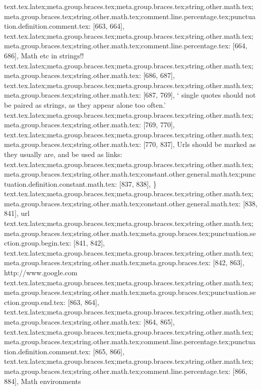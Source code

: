 {{{{{{{{{{{{{{{{{{{{{{{text.tex.latex;meta.group.braces.tex;meta.group.braces.tex;string.other.math.tex;meta.group.braces.tex;string.other.math.tex;comment.line.percentage.tex;punctuation.definition.comment.tex: [663, 664], {%
text.tex.latex;meta.group.braces.tex;meta.group.braces.tex;string.other.math.tex;meta.group.braces.tex;string.other.math.tex;comment.line.percentage.tex: [664, 686], { Math etc in strings!!}
text.tex.latex;meta.group.braces.tex;meta.group.braces.tex;string.other.math.tex;meta.group.braces.tex;string.other.math.tex: [686, 687], {
}
text.tex.latex;meta.group.braces.tex;meta.group.braces.tex;string.other.math.tex;meta.group.braces.tex;string.other.math.tex: [687, 769], {` single quotes should not be paired as strings, as they appear alone too often.'
}
text.tex.latex;meta.group.braces.tex;meta.group.braces.tex;string.other.math.tex;meta.group.braces.tex;string.other.math.tex: [769, 770], {
}
text.tex.latex;meta.group.braces.tex;meta.group.braces.tex;string.other.math.tex;meta.group.braces.tex;string.other.math.tex: [770, 837], {Urls should be marked as they usually are, and be used as links:   }
text.tex.latex;meta.group.braces.tex;meta.group.braces.tex;string.other.math.tex;meta.group.braces.tex;string.other.math.tex;constant.other.general.math.tex;punctuation.definition.constant.math.tex: [837, 838], {\}
text.tex.latex;meta.group.braces.tex;meta.group.braces.tex;string.other.math.tex;meta.group.braces.tex;string.other.math.tex;constant.other.general.math.tex: [838, 841], {url}
text.tex.latex;meta.group.braces.tex;meta.group.braces.tex;string.other.math.tex;meta.group.braces.tex;string.other.math.tex;meta.group.braces.tex;punctuation.section.group.begin.tex: [841, 842], {{}
text.tex.latex;meta.group.braces.tex;meta.group.braces.tex;string.other.math.tex;meta.group.braces.tex;string.other.math.tex;meta.group.braces.tex: [842, 863], {http://www.google.com}
text.tex.latex;meta.group.braces.tex;meta.group.braces.tex;string.other.math.tex;meta.group.braces.tex;string.other.math.tex;meta.group.braces.tex;punctuation.section.group.end.tex: [863, 864], {}}
text.tex.latex;meta.group.braces.tex;meta.group.braces.tex;string.other.math.tex;meta.group.braces.tex;string.other.math.tex: [864, 865], {
}
text.tex.latex;meta.group.braces.tex;meta.group.braces.tex;string.other.math.tex;meta.group.braces.tex;string.other.math.tex;comment.line.percentage.tex;punctuation.definition.comment.tex: [865, 866], {%
text.tex.latex;meta.group.braces.tex;meta.group.braces.tex;string.other.math.tex;meta.group.braces.tex;string.other.math.tex;comment.line.percentage.tex: [866, 884], { Math environments}
}}}}}}}}}}}}}}}}}}}}}}}}}}
